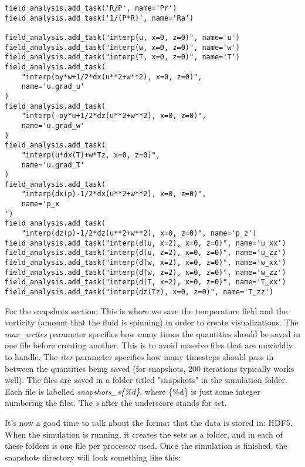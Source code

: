 \documentclass[12pt,a4paper]{report}
\begin{document}
\begin{lstlisting}
field_analysis.add_task('R/P', name='Pr')
field_analysis.add_task('1/(P*R)', name='Ra')

field_analysis.add_task("interp(u, x=0, z=0)", name='u')
field_analysis.add_task("interp(w, x=0, z=0)", name='w')
field_analysis.add_task("interp(T, x=0, z=0)", name='T')
field_analysis.add_task(
    "interp(oy*w+1/2*dx(u**2+w**2), x=0, z=0)",
    name='u.grad_u'
)
field_analysis.add_task(
    "interp(-oy*u+1/2*dz(u**2+w**2), x=0, z=0)",
    name='u.grad_w'
)
field_analysis.add_task(
    "interp(u*dx(T)+w*Tz, x=0, z=0)",
    name='u.grad_T'
)
field_analysis.add_task(
    "interp(dx(p)-1/2*dx(u**2+w**2), x=0, z=0)",
    name='p_x
')
field_analysis.add_task(
    "interp(dz(p)-1/2*dz(u**2+w**2), x=0, z=0)", name='p_z')
field_analysis.add_task("interp(d(u, x=2), x=0, z=0)", name='u_xx')
field_analysis.add_task("interp(d(u, z=2), x=0, z=0)", name='u_zz')
field_analysis.add_task("interp(d(w, x=2), x=0, z=0)", name='w_xx')
field_analysis.add_task("interp(d(w, z=2), x=0, z=0)", name='w_zz')
field_analysis.add_task("interp(d(T, x=2), x=0, z=0)", name='T_xx')
field_analysis.add_task("interp(dz(Tz), x=0, z=0)", name='T_zz')
	\end{lstlisting}

	For the snapshots section: This is where we save the temperature field and the vorticity (amount that the fluid is spinning) in order to create visualizations. The \textit{max\_writes} parameter specifies how many times the quantities should be saved in one file before creating another. This is to avoid massive files that are unwieldly to handle. The \textit{iter} parameter specifies how many timesteps should pass in between the quantities being saved (for snapshots, 200 iterations typically works well). The files are saved in a folder titled "snapshots" in the simulation folder. Each file is labelled \textit{snapshots\_s\{\%d\}}, where \{\%d\} is just some integer numbering the files. The \textit{s} after the underscore stands for set.
	
	It's now a good time to talk about the format that the data is stored in: HDF5. When the simulation is running, it creates the sets as a folder, and in each of these folders is one file per processor used. Once the simulation is finished, the snapshots directory will look something like this:

\end{document}

